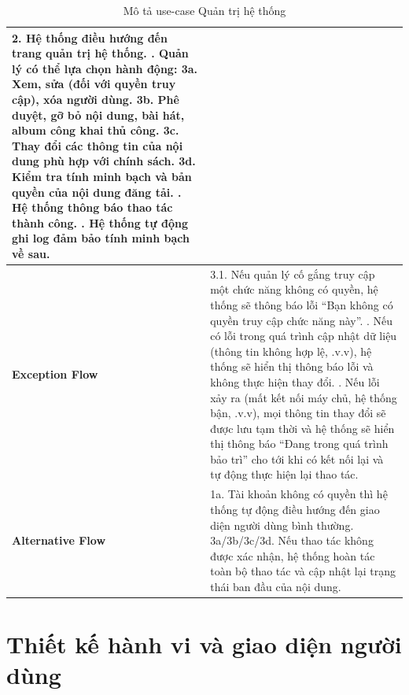 \documentclass[a4paper]{article}
\newcommand{\cach}{\hspace*{1.5em}\ignorespaces}
\begin{document}
\begin{table}[H]
\begin{tabularx}{\textwidth}{|l|X|}
		2. Hệ thống điều hướng đến trang quản trị hệ thống. \newline
		3. Quản lý có thể lựa chọn hành động: \newline
		\cach 3a. Xem, sửa (đối với quyền truy cập), xóa người dùng. \newline
		\cach 3b. Phê duyệt, gỡ bỏ nội dung, bài hát, album công khai thủ công. \newline
		\cach 3c. Thay đổi các thông tin của nội dung phù hợp với chính sách. \newline
		\cach 3d. Kiểm tra tính minh bạch và bản quyền của nội dung đăng tải. \newline
		4. Hệ thống thông báo thao tác thành công. \newline
		5. Hệ thống tự động ghi log đảm bảo tính minh bạch về sau.                                                                                                                                                                                  \\ \hline
		\textbf{Exception Flow}
		                       & 3.1. Nếu quản lý cố gắng truy cập một chức năng không có quyền, hệ thống sẽ thông báo lỗi ``Bạn không có quyền truy cập chức năng này''. \newline
		3.2. Nếu có lỗi trong quá trình cập nhật dữ liệu (thông tin không hợp lệ, .v.v), hệ thống sẽ hiển thị thông báo lỗi và không thực hiện thay đổi. \newline
		3.3. Nếu lỗi xảy ra (mất kết nối máy chủ, hệ thống bận, .v.v), mọi thông tin thay đổi sẽ được lưu tạm thời và hệ thống sẽ hiển thị thông báo ``Đang trong quá trình bảo trì'' cho tới khi có kết nối lại và tự động thực hiện lại thao tác. \\ \hline
		\textbf{Alternative Flow}
		                       & 1a. Tài khoản không có quyền thì hệ thống tự động điều hướng đến giao diện người dùng bình thường. \newline
		3a/3b/3c/3d. Nếu thao tác không được xác nhận, hệ thống hoàn tác toàn bộ thao tác và cập nhật lại trạng thái ban đầu của nội dung.                                                                                                          \\ \hline
	\end{tabularx}
	\caption{Mô tả use-case Quản trị hệ thống}
\end{table}

\newpage
\section{Thiết kế hành vi và giao diện người dùng}
\end{document}
